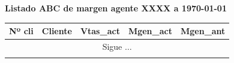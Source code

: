 \documentclass[a4paper]{article}
\begin{document}
\begin{center}
\textbf{Listado ABC de margen agente XXXX a {\today}}
\small
\begin{longtable}{llrrr}
\toprule
\textbf{Nº cli} & \textbf{Cliente}&\textbf{Vtas\_act}&\textbf{Mgen\_act}&\textbf{Mgen\_ant}\\
\toprule
\endhead
\multicolumn{5}{c}{Sigue $\ldots$}\\
\endfoot
\endlastfoot

\bottomrule
\end{longtable}
\end{center}
\end{document}
